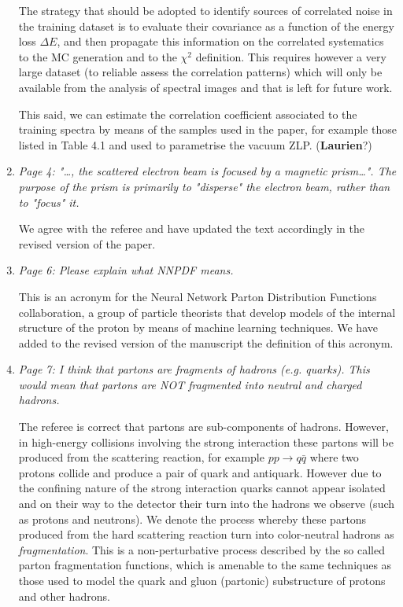 \documentclass[12pt]{article}
\begin{document}
\begin{enumerate}
  The strategy that should be adopted to identify sources of correlated noise in the training
  dataset is to evaluate their covariance as a function of the energy loss $\Delta E$,
  and then propagate this information on the correlated systematics to the MC generation
  and to the $\chi^2$ definition.
  This requires however a very large dataset (to reliable assess the correlation patterns)
  which will only be available from the analysis of spectral images and that is left for
  future work.

  This said, we can estimate the correlation coefficient associated to the training
  spectra by means of the samples used in the paper, for example those
  listed in Table 4.1 and used to parametrise the vacuum ZLP. ({\bf Laurien}?)
  
  
\item {\it	Page 4: "…, the scattered electron beam is focused by a magnetic prism…". The purpose of the prism is primarily to "disperse" the electron beam, rather than to "focus" it. }

We agree with the referee and have updated the text accordingly in the revised version of the paper.

\item {\it	Page 6: Please explain what NNPDF means.}

  This is an acronym for the Neural Network Parton Distribution Functions collaboration, a group
  of particle theorists that develop models of the internal structure of the proton by means
  of machine learning techniques. We have added to the revised version of the manuscript
  the definition of this acronym.
  
\item {\it	Page 7: I think that partons are fragments of hadrons (e.g. quarks). This would mean that partons are NOT fragmented into neutral and charged hadrons.}

  The referee is correct that partons are sub-components of hadrons. However, in high-energy collisions
  involving the strong interaction these partons will be produced from the scattering reaction,
  for example $pp \to q\bar{q}$ where two protons collide and produce a pair of quark and antiquark.
  However due to the confining nature of the strong interaction quarks cannot appear isolated
  and on their way to the detector their turn into the hadrons we observe (such as protons and neutrons).
  We denote the process whereby these partons produced from the hard scattering reaction turn
  into color-neutral hadrons as {\it fragmentation}.
  This is a non-perturbative process described by the so called parton fragmentation functions,
  which is amenable to the same techniques as those used to model the quark and gluon (partonic)
  substructure of protons and other hadrons.


\end{enumerate}
\end{document}
